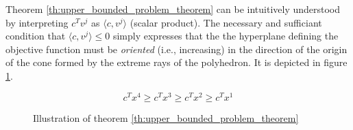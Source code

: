 Theorem \ref{th:upper_bounded_problem_theorem} can be intuitively understood by interpreting $c^Tv^j$ as $\langle c, v^j\rangle$ (scalar product). The necessary and sufficiant condition that $\langle c, v^j\rangle\le 0$ simply expresses that the the hyperplane defining the objective function must be \textit{oriented} (i.e., increasing) in the direction of the origin of the cone formed by the extreme rays of the polyhedron. It is depicted in figure \ref{fig:upper_bounded_problem}.

\begin{figure}[h!]
    \centering
    \[ c^Tx^4 \ge c^Tx^3\ge c^Tx^2 \ge c^Tx^1 \]
    \caption{Illustration of theorem \ref{th:upper_bounded_problem_theorem}}
    \label{fig:upper_bounded_problem}
\end{figure}